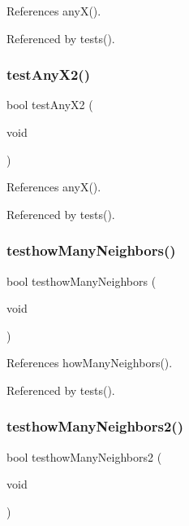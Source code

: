 References any\+X().



Referenced by tests().

\mbox{\label{tests_8h_a9d0f0ee72a131b3f80b129204e602f8f}} 
\subsubsection{test\+Any\+X2()}
{\footnotesize\ttfamily bool test\+Any\+X2 (\begin{DoxyParamCaption}\item[{void}]{ }\end{DoxyParamCaption})}



References any\+X().



Referenced by tests().

\mbox{\label{tests_8h_a8b7ce08ce78276372b8d74b2992567a0}} 
\subsubsection{testhow\+Many\+Neighbors()}
{\footnotesize\ttfamily bool testhow\+Many\+Neighbors (\begin{DoxyParamCaption}\item[{void}]{ }\end{DoxyParamCaption})}



References how\+Many\+Neighbors().



Referenced by tests().

\mbox{\label{tests_8h_a53e35009f6dab4bf3c1196de8c3513d7}} 
\subsubsection{testhow\+Many\+Neighbors2()}
{\footnotesize\ttfamily bool testhow\+Many\+Neighbors2 (\begin{DoxyParamCaption}\item[{void}]{ }\end{DoxyParamCaption})}



